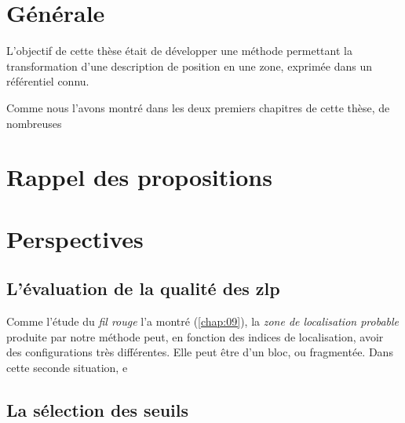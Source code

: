 \section{Générale}

L'objectif de cette thèse était de développer une méthode permettant
la transformation d'une description de position en une zone, exprimée
dans un référentiel connu.


Comme nous l'avons montré dans les deux premiers chapitres de cette
thèse, de nombreuses



\section{Rappel des propositions}

\section{Perspectives}



\subsection{L'évaluation de la qualité des \ac{zlp}}

Comme l'étude du \emph{fil rouge} l'a montré (\autoref{chap:09}), la
\emph{zone de localisation probable} produite par notre méthode peut,
en fonction des indices de localisation, avoir des configurations très
différentes. Elle peut être d'un bloc, ou fragmentée. Dans cette
seconde situation,  e

\subsection{La sélection des seuils}


